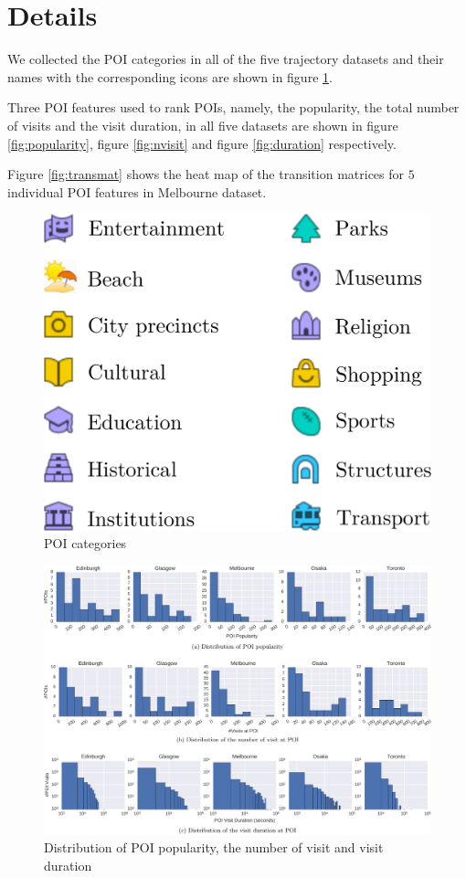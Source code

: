 \appendix
\section{Details}
We collected the POI categories in all of the five trajectory datasets
and their names with the corresponding icons are shown in figure \ref{fig:poicats}.

Three POI features used to rank POIs, namely, the popularity, 
the total number of visits and the visit duration, in all five datasets are shown in 
figure \ref{fig:popularity}, figure \ref{fig:nvisit} and figure \ref{fig:duration} respectively.

Figure \ref{fig:transmat} shows the heat map of the transition matrices for $5$ individual POI features
in Melbourne dataset.


\begin{figure}
\centering
\includegraphics[scale=.32]{fig/poi_cats.pdf}
\caption{POI categories}
\label{fig:poicats}
\end{figure}

\begin{figure}
\includegraphics[width=\textwidth]{fig/feature_distro.pdf}
\caption{Distribution of POI popularity, the number of visit and visit duration}
\label{fig:distro}
\end{figure}

